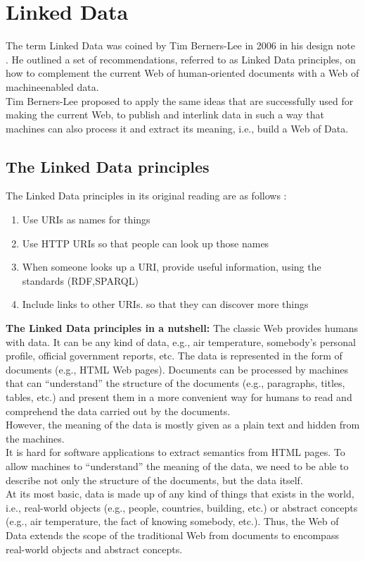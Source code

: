 \documentclass[a4paper,12pt,oneside]{report}
\begin{document}
{{{\section{Linked Data}
{The term Linked Data was coined by Tim Berners-Lee in 2006 in his design note . He outlined a set of recommendations, referred to as Linked Data principles, on how to complement the current Web of human-oriented documents with a Web of machineenabled data. \\
Tim Berners-Lee proposed to apply the same ideas that are successfully used for making the current Web, to publish and interlink data in such a way that machines can also process it and extract its meaning, i.e., build a Web of Data.\\
\subsection{The Linked Data principles}
{The Linked Data principles in its original reading are as follows :}
\begin{enumerate}
\item{Use URIs as names for things}
\item{Use HTTP URIs so that people can look up those names}
\item{When someone looks up a URI, provide useful information, using the standards (RDF,SPARQL)}
\item{Include links to other URIs. so that they can discover more things}
\end{enumerate}
\textbf{The Linked Data principles in a nutshell:}  The classic Web provides humans with data. It can be any kind of data, e.g., air temperature, somebody’s personal profile, official government reports, etc. The data is represented in the form of documents (e.g.,
HTML Web pages). Documents can be processed by machines that can “understand” the structure of the documents (e.g., paragraphs, titles, tables, etc.) and present them in a more convenient way for humans to read and comprehend the data carried out by the documents.\\ However, the meaning of the data is mostly given as a plain text and hidden from the machines. \\
It is hard for software applications to extract semantics from HTML pages. To allow machines to “understand” the meaning of the data, we need to be able to describe not only the structure of the documents, but the data itself. \\
At its most basic, data is made up of any kind of things that exists in the world, i.e., real-world objects (e.g., people, countries, building, etc.) or abstract concepts (e.g., air temperature, the fact of knowing somebody, etc.). Thus, the Web of Data extends the scope of the traditional Web from documents to encompass real-world objects and abstract concepts.\\
}}}}
\end{document}
